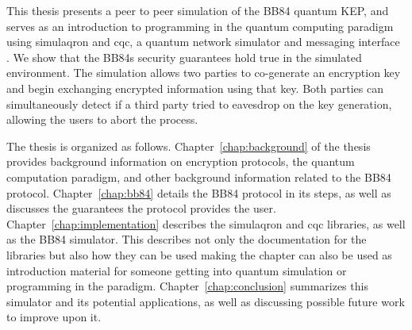 This thesis presents a peer to peer simulation of the BB84 quantum KEP, and serves as an introduction to programming in the quantum computing paradigm using simulaqron and cqc, a quantum network simulator and messaging interface \cite{simulaqron}.
We show that the BB84s security guarantees hold true in the simulated environment.
The simulation allows two parties to co-generate an encryption key and begin exchanging encrypted information using that key.
Both parties can simultaneously detect if a third party tried to eavesdrop on the key generation, allowing the users to abort the process. 

The thesis is organized as follows.
Chapter~\ref{chap:background} of the thesis provides background information on encryption protocols, the quantum computation paradigm, and other background information related to the BB84 protocol. 
Chapter~\ref{chap:bb84} details the BB84 protocol in its steps, as well as discusses the guarantees the protocol provides the user.
Chapter~\ref{chap:implementation} describes the simulaqron and cqc libraries, as well as the BB84 simulator.
This describes not only the documentation for the libraries but also how they can be used making the chapter can also be used as introduction material for someone getting into quantum simulation or programming in the paradigm.
Chapter~\ref{chap:conclusion} summarizes this simulator and its potential applications, as well as discussing possible future work to improve upon it.

